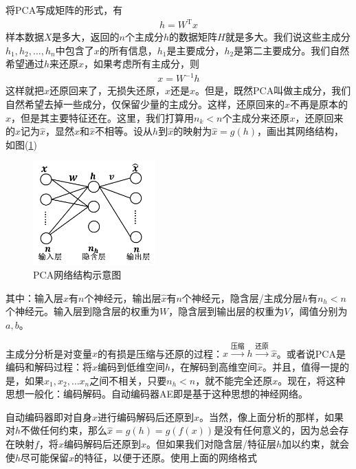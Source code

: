         \par
        将PCA写成矩阵的形式，有
        \begin{align*}
        h = W^\mathrm{T}x
        \end{align*}
        样本数据$X$是多大，返回的$n$个主成分$h$的数据矩阵$H$就是多大。我们说这些主成分$h_1,h_2,\dots,h_n$中包含了$x$的所有信息，$h_1$是主要成分，$h_2$是第二主要成分。我们自然希望通过$h$来还原$x$，如果考虑所有主成分，则
        \begin{align*}
        x = W^{-1}h
        \end{align*}
        这样就把$x$还原回来了，无损失还原，$x$还是$x$。但是，既然PCA叫做主成分，我们自然希望去掉一些成分，仅保留少量的主成分。这样，还原回来的$x$不再是原本的$x$，但是其主要特征还在。这里，我们打算用$n_k<n$个主成分来还原$x$，还原回来的$x$记为$\hat{x}$，显然$x$和$\hat{x}$不相等。设从$h$到$\hat{x}$的映射为$\hat{x} = g(h)$，画出其网络结构，如图(\ref{fig:PCA网络结构示意图2})
            \begin{figure}[H]
            \centering
            \includegraphics[height=4cm]{images/PCA_net_structure2.jpg}
            \caption{PCA网络结构示意图}
            \label{fig:PCA网络结构示意图2}
            \end{figure}
        其中：输入层$x$有$n$个神经元，输出层$\hat{x}$有$n$个神经元，隐含层/主成分层$h$有$n_h<n$个神经元。输入层到隐含层的权重为$W$，隐含层到输出层的权重为$V$，阈值分别为$a,b$。
        \par
        主成分分析是对变量$x$的有损是压缩与还原的过程：$x\xrightarrow{\text{压缩}}h\xrightarrow{\text{还原}}\hat{x}$。或者说PCA是编码和解码过程：将$x$编码到低维空间$h$，在解码到高维空间$\hat{x}$。并且，值得一提的是，如果$x_1,x_2,\dots x_n$之间不相关，只要$n_h<n$，就不能完全还原$x$。现在，将这种思想一般化：编码解码。自动编码器AE即是基于这种思想的神经网络。
        \par
        自动编码器即对自身$x$进行编码解码后还原到$x$。当然，像上面分析的那样，如果对$h$不做任何约束，那么$\hat{x} = g(h) = g(f(x))$是没有任何意义的，因为总会存在映射$f$，将$x$编码解码后还原到$x$。但如果我们对隐含层/特征层$h$加以约束，就会使$h$尽可能保留$x$的特征，以便于还原。使用上面的网络格式
